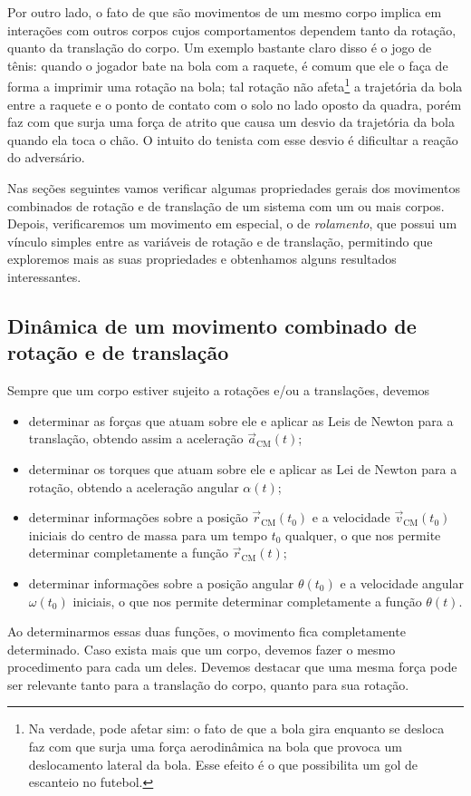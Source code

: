 Por outro lado, o fato de que são movimentos de um mesmo corpo implica em interações com outros corpos cujos comportamentos dependem tanto da rotação, quanto da translação do corpo. Um exemplo bastante claro disso é o jogo de tênis: quando o jogador bate na bola com a raquete, é comum que ele o faça de forma a imprimir uma rotação na bola; tal rotação não afeta\footnote{Na verdade, pode afetar sim: o fato de que a bola gira enquanto se desloca faz com que surja uma força aerodinâmica na bola que provoca um deslocamento lateral da bola. Esse efeito é o que possibilita um gol de escanteio no futebol.} a trajetória da bola entre a raquete e o ponto de contato com o solo no lado oposto da quadra, porém faz com que surja uma força de atrito que causa um desvio da trajetória da bola quando ela toca o chão. O intuito do tenista com esse desvio é dificultar a reação do adversário.

Nas seções seguintes vamos verificar algumas propriedades gerais dos movimentos combinados de rotação e de translação de um sistema com um ou mais corpos. Depois, verificaremos um movimento em especial, o de \emph{rolamento}, que possui um vínculo simples entre as variáveis de rotação e de translação, permitindo que exploremos mais as suas propriedades e obtenhamos alguns resultados interessantes.

\subsection{Dinâmica de um movimento combinado de rotação e de translação}

Sempre que um corpo estiver sujeito a rotações e/ou a translações, devemos
\begin{itemize}
    \item determinar as forças que atuam sobre ele e aplicar as Leis de Newton para a translação, obtendo assim a aceleração $\vec{a}_{\text{CM}}(t)$;
    \item determinar os torques que atuam sobre ele e aplicar as Lei de Newton para a rotação, obtendo a aceleração angular $\alpha(t)$;
    \item determinar informações sobre a posição $\vec{r}_{\text{CM}}(t_0)$ e a velocidade $\vec{v}_{\text{CM}}(t_0)$ iniciais do centro de massa para um tempo $t_0$ qualquer, o que nos permite determinar completamente a função $\vec{r}_{\text{CM}}(t)$;
    \item determinar informações sobre a posição angular $\theta(t_0)$ e a velocidade angular $\omega(t_0)$ iniciais, o que nos permite determinar completamente a função $\theta(t)$.
\end{itemize}
%
Ao determinarmos essas duas funções, o movimento fica completamente determinado. Caso exista mais que um corpo, devemos fazer o mesmo procedimento para cada um deles. Devemos destacar que uma mesma força pode ser relevante tanto para a translação do corpo, quanto para sua rotação.

